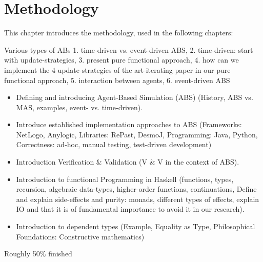 \chapter{Methodology}
This chapter introduces the methodology, used in the following chapters:

Various types of ABs
1. time-driven vs. event-driven ABS, 2. time-driven: start with update-strategies, 3. present pure functional approach, 4. how can we implement the 4 update-strategies of the art-iterating paper in our pure functional approach, 5. interaction between agents, 6. event-driven ABS

\begin{itemize}
	\item Defining and introducing Agent-Based Simulation (ABS) (History, ABS vs. MAS, examples, event- vs. time-driven).
	\item Introduce established implementation approaches to ABS (Frameworks: NetLogo, Anylogic, Libraries: RePast, DesmoJ, Programming: Java, Python, Correctness: ad-hoc, manual testing, test-driven development)
	\item Introduction Verification \& Validation (V \& V in the context of ABS).
	\item Introduction to functional Programming in Haskell (functions, types, recursion, algebraic data-types, higher-order functions, continuations, Define and explain side-effects and purity: monads, different types of effects, explain IO and that it is of fundamental importance to avoid it in our research).
	\item Introduction to dependent types (Example, Equality as Type, Philosophical Foundations: Constructive mathematics)
\end{itemize}
Roughly 50\% finished